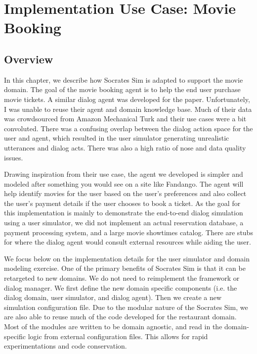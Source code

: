 \chapter{Implementation Use Case:  Movie Booking}
\label{chap:movie}

\section{Overview}
In this chapter, we describe how Socrates Sim is adapted to support the movie domain. The goal of the movie booking agent is to help the end user purchase movie tickets. A similar dialog agent was developed for the \cite{li_usersim} paper. Unfortunately, I was unable to reuse their agent and domain knowledge base. Much of their data was crowdsourced from Amazon Mechanical Turk and their use cases were a bit convoluted. There was a confusing overlap between the dialog action space for the user and agent, which resulted in the user simulator generating unrealistic utterances and dialog acts. There was also a high ratio of nose and data quality issues.  

Drawing inspiration from their use case, the agent we developed is simpler and modeled after something you would see on a site like Fandango. The agent will help identify movies for the user based on the user's preferences and also collect the user's payment details if the user chooses to book a ticket. As the goal for this implementation is mainly to demonstrate the end-to-end dialog simulation using a user simulator, we did not implement an actual reservation database, a payment processing system, and a large movie showtimes catalog. There are stubs for where the dialog agent would consult external resources while aiding the user. 

We focus below on the implementation details for the user simulator and domain modeling exercise. One of the primary benefits of Socrates Sim is that it can be retargeted to new domains. We do not need to reimplement the framework or dialog manager. We first define the new domain specific components (i.e. the dialog domain, user simulator, and dialog agent). Then we create a new simulation configuration file. Due to the modular nature of the Socrates Sim, we are also able to reuse much of the code developed for the restaurant domain. Most of the modules are written to be domain agnostic, and read in the domain-specific logic from external configuration files. This allows for rapid experimentations and code conservation.

